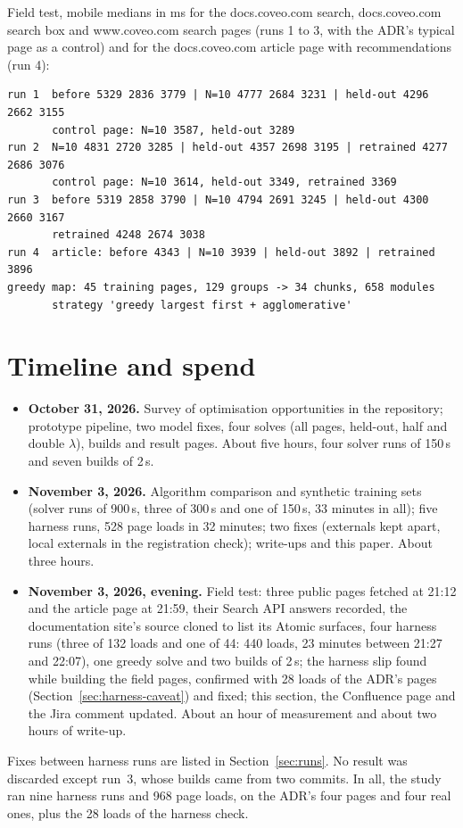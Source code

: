 \documentclass[11pt]{article}
\begin{document}
\noindent Field test, mobile medians in ms for the docs.coveo.com search, docs.coveo.com search box and www.coveo.com search pages (runs 1 to 3, with the ADR's typical page as a control) and for the docs.coveo.com article page with recommendations (run 4):
\par{\footnotesize
\begin{verbatim}
run 1  before 5329 2836 3779 | N=10 4777 2684 3231 | held-out 4296 2662 3155
       control page: N=10 3587, held-out 3289
run 2  N=10 4831 2720 3285 | held-out 4357 2698 3195 | retrained 4277 2686 3076
       control page: N=10 3614, held-out 3349, retrained 3369
run 3  before 5319 2858 3790 | N=10 4794 2691 3245 | held-out 4300 2660 3167
       retrained 4248 2674 3038
run 4  article: before 4343 | N=10 3939 | held-out 3892 | retrained 3896
greedy map: 45 training pages, 129 groups -> 34 chunks, 658 modules
       strategy 'greedy largest first + agglomerative'
\end{verbatim}
}

\section{Timeline and spend}\label{app:spend}
\begin{itemize}
\item \textbf{October 31, 2026.} Survey of optimisation opportunities in the repository; prototype pipeline, two model fixes, four solves (all pages, held-out, half and double $\lambda$), builds and result pages. About five hours, four solver runs of 150\,s and seven builds of 2\,s.
\item \textbf{November 3, 2026.} Algorithm comparison and synthetic training sets (solver runs of 900\,s, three of 300\,s and one of 150\,s, 33 minutes in all); five harness runs, 528 page loads in 32 minutes; two fixes (externals kept apart, local externals in the registration check); write-ups and this paper. About three hours.
\item \textbf{November 3, 2026, evening.} Field test: three public pages fetched at 21:12 and the article page at 21:59, their Search API answers recorded, the documentation site's source cloned to list its Atomic surfaces, four harness runs (three of 132 loads and one of 44: 440 loads, 23 minutes between 21:27 and 22:07), one greedy solve and two builds of 2\,s; the harness slip found while building the field pages, confirmed with 28 loads of the ADR's pages (Section~\ref{sec:harness-caveat}) and fixed; this section, the Confluence page and the Jira comment updated. About an hour of measurement and about two hours of write-up.
\end{itemize}
Fixes between harness runs are listed in Section~\ref{sec:runs}. No result was discarded except run~3, whose builds came from two commits. In all, the study ran nine harness runs and 968 page loads, on the ADR's four pages and four real ones, plus the 28 loads of the harness check.
\end{document}
